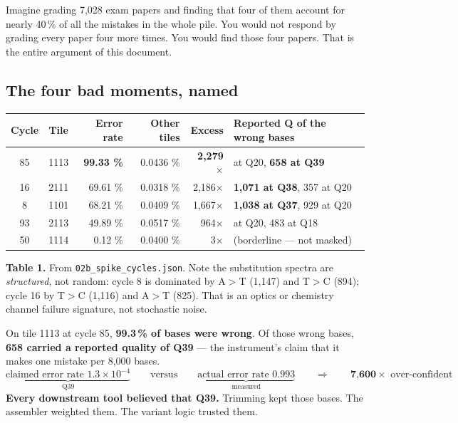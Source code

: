 \begin{plain}
Imagine grading 7{,}028 exam papers and finding that four of them account for nearly 40\,\% of all the
mistakes in the whole pile. You would not respond by grading every paper four more times. You would
find those four papers. That is the entire argument of this document.
\end{plain}

\subsection{The four bad moments, named}

\begin{center}\small
\begin{tabular}{@{}c c r r r >{\raggedright\arraybackslash}p{5.3cm}@{}}
\toprule
\rowcolor{alert!12}
\textbf{Cycle} & \textbf{Tile} & \textbf{Error rate} & \textbf{Other tiles} & \textbf{Excess} &
\textbf{Reported Q of the wrong bases}\\
\midrule
\rowcolor{alert!7}
85 & 1113 & \textbf{99.33 \%} & 0.0436 \% & \textbf{2{,}279$\times$} & 879 at Q20, \textbf{658 at Q39}\\
16 & 2111 & 69.61 \% & 0.0318 \% & 2{,}186$\times$ & \textbf{1{,}071 at Q38}, 357 at Q20\\
 8 & 1101 & 68.21 \% & 0.0409 \% & 1{,}667$\times$ & \textbf{1{,}038 at Q37}, 929 at Q20\\
93 & 2113 & 49.89 \% & 0.0517 \% & 964$\times$ & 526 at Q20, 483 at Q18\\
\midrule
50 & 1114 & 0.12 \% & 0.0400 \% & 3$\times$ & (borderline --- not masked)\\
\bottomrule
\end{tabular}
\end{center}
\vspace{-2pt}
\begin{center}\begin{minipage}{0.93\textwidth}\footnotesize\color{slate}
\textbf{Table 1.}\; From \texttt{02b\_spike\_cycles.json}. Note the substitution spectra are
\emph{structured}, not random: cycle 8 is dominated by A$>$T (1{,}147) and T$>$C (894); cycle 16 by
T$>$C (1{,}116) and A$>$T (825). That is an optics or chemistry channel failure signature, not
stochastic noise.
\end{minipage}\end{center}

\begin{alertbox}[title={The part that should worry us: the confidence was wrong, not just the base}]
On tile 1113 at cycle 85, \textbf{99.3\,\% of bases were wrong}. Of those wrong bases, \textbf{658
carried a reported quality of Q39} --- the instrument's claim that it makes one mistake per 8{,}000
bases.
\[
\underbrace{\text{claimed error rate } 1.3\times10^{-4}}_{\text{Q39}}
\qquad\text{versus}\qquad
\underbrace{\text{actual error rate } 0.993}_{\text{measured}}
\qquad\Longrightarrow\qquad
\textbf{7{,}600}\times\text{ over-confident}
\]
\textbf{Every downstream tool believed that Q39.} Trimming kept those bases. The assembler weighted
them. The variant logic trusted them.
\end{alertbox}

